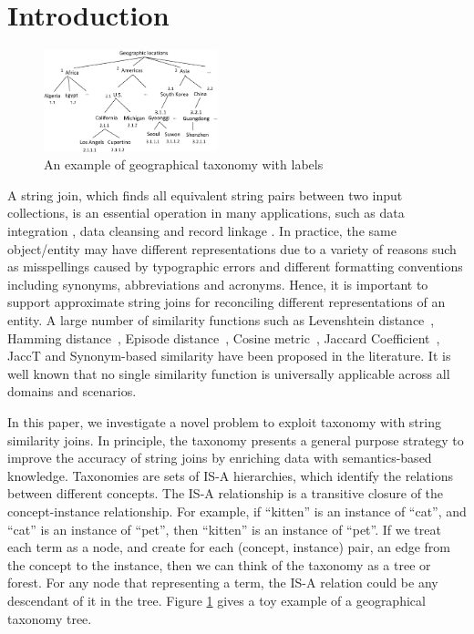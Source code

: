 \section{Introduction}

\begin{figure}[t]
\centering
\includegraphics[width=0.45\textwidth]{figures/taxonomylabels}
 \caption{An example of geographical taxonomy with labels}
\label{fig:toytaxonomyexample}
\end{figure}


A string join, which finds all equivalent string pairs between two input collections, is an essential operation in many applications, such as  data integration \cite{conf/sigmod/Sarawagi04}, data cleansing \cite{conf/vldb/ArasuGK06,journals/www/LiJM06} and record linkage \cite{books/Winkler99}. In practice, the same object/entity may have different representations  due to a variety of reasons such as misspellings
caused by typographic errors and different formatting conventions including synonyms, abbreviations and acronyms. Hence, it is important to support approximate string joins for reconciling different
representations of an entity. A large number of  similarity functions such as Levenshtein distance~\cite{conf/sigmod/WangLF12},
Hamming distance~\cite{conf/spire/Kondrak05}, Episode
distance~\cite{conf/ijcai/CohenRF03}, Cosine
metric~\cite{journals/ipm/SaltonB88}, Jaccard
Coefficient~\cite{conf/icde/ChaudhuriGK06,conf/icde/LiLL08}, JaccT \cite{conf/icde/ArasuCK08} and Synonym-based similarity \cite{conf/sigmod/LuLWLW13} have been proposed in the literature. It is well known
that no single similarity function is universally applicable
across all domains and scenarios.

In this paper, we investigate a novel problem to exploit taxonomy with string similarity joins. In principle, the taxonomy presents a general purpose strategy to improve the accuracy of string joins by enriching data with semantics-based knowledge. Taxonomies are sets of IS-A hierarchies, which identify the relations between different concepts. The IS-A relationship
is a transitive closure of the concept-instance relationship.
For example, if ``\textsf{kitten}'' is an instance of ``\textsf{cat}'', and
``\textsf{cat}'' is an instance of ``\textsf{pet}'', then ``\textsf{kitten}'' is an instance
of ``\textsf{pet}''. If we treat each term as a node, and create
for each (concept, instance) pair, an edge from the concept
to the instance, then we can think of the taxonomy as a tree or forest. For any node that representing a term,
the IS-A relation could be any descendant of it in the tree. Figure
\ref{fig:toytaxonomyexample} gives a toy example of a geographical taxonomy tree.

